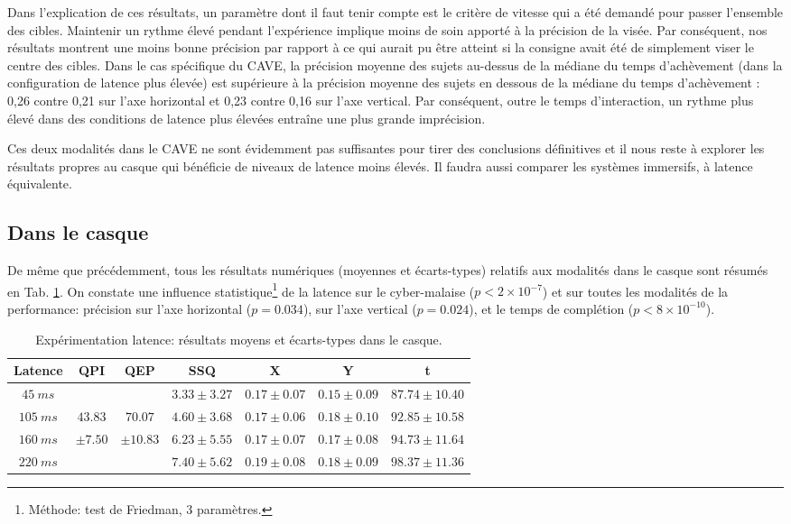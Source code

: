 	\par Dans l'explication de ces résultats, un paramètre dont il faut tenir compte est le critère de vitesse qui a été demandé pour passer l'ensemble des cibles. Maintenir un rythme élevé pendant l'expérience implique moins de soin apporté à la précision de la visée. Par conséquent, nos résultats montrent une moins bonne précision par rapport à ce qui aurait pu être atteint si la consigne avait été de simplement viser le centre des cibles. Dans le cas spécifique du CAVE, la précision moyenne des sujets au-dessus de la médiane du temps d'achèvement (dans la configuration de latence plus élevée) est supérieure à la précision moyenne des sujets en dessous de la médiane du temps d'achèvement : 0,26 contre 0,21 sur l'axe horizontal et 0,23 contre 0,16 sur l'axe vertical. Par conséquent, outre le temps d'interaction, un rythme plus élevé dans des conditions de latence plus élevées entraîne une plus grande imprécision. 

	\par Ces deux modalités dans le CAVE ne sont évidemment pas suffisantes pour tirer des conclusions définitives et il nous reste à explorer les résultats propres au casque qui bénéficie de niveaux de latence moins élevés. Il faudra aussi comparer les systèmes immersifs, à latence équivalente.
	
	\subsection{Dans le casque}
	\par De même que précédemment, tous les résultats numériques (moyennes et écarts-types) relatifs aux modalités dans le casque sont résumés en Tab. \ref{tab:resultats_casque_latence}. On constate une influence statistique\footnote{Méthode: test de Friedman, 3 paramètres.} de la latence sur le cyber-malaise ($p < 2 \times 10^{-7}$) et sur toutes les modalités de la performance: précision sur l'axe horizontal ($p = 0.034$), sur l'axe vertical ($p = 0.024$), et le temps de complétion ($p < 8 \times 10^{-10}$).
	
	\begin{table}[h]	
		\centering
		\caption{Expérimentation latence: résultats moyens et écarts-types dans le casque.}
		\label{tab:resultats_casque_latence}
		\begin{tabular}{c|c|c|c|c|c|c}
			\textbf{Latence} & \textbf{QPI} & \textbf{QEP} & \textbf{SSQ} & \textbf{X} & \textbf{Y} & \textbf{t}\\ \hline			
			$45~ms$ & & & $3.33 \pm 3.27$ & $0.17 \pm 0.07$ & $0.15 \pm 0.09$ & $87.74 \pm 10.40$\\
			$105~ms$ & $43.83$ & $70.07$ & $4.60 \pm 3.68$ & $0.17 \pm 0.06$ & $0.18 \pm 0.10$ & $92.85 \pm 10.58$\\			
			$160~ms$ & $\pm 7.50$ & $\pm 10.83$ & $6.23 \pm 5.55$ & $0.17 \pm 0.07$ & $0.17 \pm 0.08$ & $94.73 \pm 11.64$\\
			$220~ms$ & & & $7.40 \pm 5.62$ & $0.19 \pm 0.08$ & $0.18 \pm 0.09$ & $98.37 \pm 11.36$\\
		\end{tabular}
	\end{table}
	
